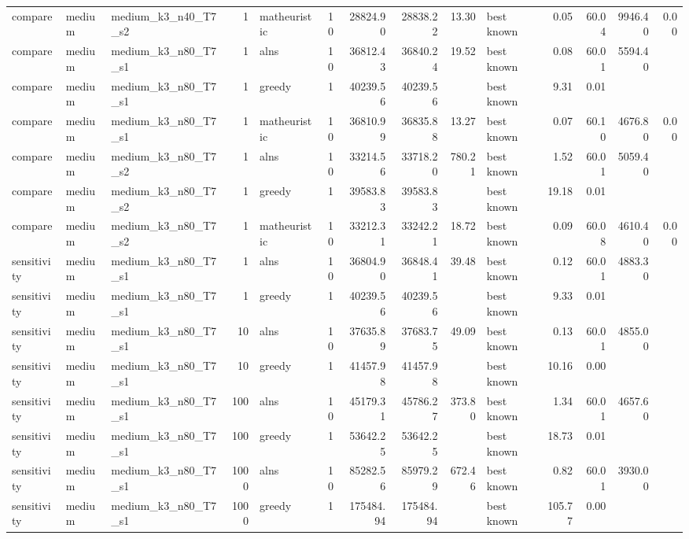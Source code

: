 \begin{tabular}{lllrlrrrrlrrrr}
compare & medium & medium\_k3\_n40\_T7\_s2 & 1 & matheuristic & 10 & 28824.90 & 28838.22 & 13.30 & best known & 0.05 & 60.04 & 9946.40 & 0.00 \\
compare & medium & medium\_k3\_n80\_T7\_s1 & 1 & alns & 10 & 36812.43 & 36840.24 & 19.52 & best known & 0.08 & 60.01 & 5594.40 &  \\
compare & medium & medium\_k3\_n80\_T7\_s1 & 1 & greedy & 1 & 40239.56 & 40239.56 &  & best known & 9.31 & 0.01 &  &  \\
compare & medium & medium\_k3\_n80\_T7\_s1 & 1 & matheuristic & 10 & 36810.99 & 36835.88 & 13.27 & best known & 0.07 & 60.10 & 4676.80 & 0.00 \\
compare & medium & medium\_k3\_n80\_T7\_s2 & 1 & alns & 10 & 33214.56 & 33718.20 & 780.21 & best known & 1.52 & 60.01 & 5059.40 &  \\
compare & medium & medium\_k3\_n80\_T7\_s2 & 1 & greedy & 1 & 39583.83 & 39583.83 &  & best known & 19.18 & 0.01 &  &  \\
compare & medium & medium\_k3\_n80\_T7\_s2 & 1 & matheuristic & 10 & 33212.31 & 33242.21 & 18.72 & best known & 0.09 & 60.08 & 4610.40 & 0.00 \\
sensitivity & medium & medium\_k3\_n80\_T7\_s1 & 1 & alns & 10 & 36804.90 & 36848.41 & 39.48 & best known & 0.12 & 60.01 & 4883.30 &  \\
sensitivity & medium & medium\_k3\_n80\_T7\_s1 & 1 & greedy & 1 & 40239.56 & 40239.56 &  & best known & 9.33 & 0.01 &  &  \\
sensitivity & medium & medium\_k3\_n80\_T7\_s1 & 10 & alns & 10 & 37635.89 & 37683.75 & 49.09 & best known & 0.13 & 60.01 & 4855.00 &  \\
sensitivity & medium & medium\_k3\_n80\_T7\_s1 & 10 & greedy & 1 & 41457.98 & 41457.98 &  & best known & 10.16 & 0.00 &  &  \\
sensitivity & medium & medium\_k3\_n80\_T7\_s1 & 100 & alns & 10 & 45179.31 & 45786.27 & 373.80 & best known & 1.34 & 60.01 & 4657.60 &  \\
sensitivity & medium & medium\_k3\_n80\_T7\_s1 & 100 & greedy & 1 & 53642.25 & 53642.25 &  & best known & 18.73 & 0.01 &  &  \\
sensitivity & medium & medium\_k3\_n80\_T7\_s1 & 1000 & alns & 10 & 85282.56 & 85979.29 & 672.46 & best known & 0.82 & 60.01 & 3930.00 &  \\
sensitivity & medium & medium\_k3\_n80\_T7\_s1 & 1000 & greedy & 1 & 175484.94 & 175484.94 &  & best known & 105.77 & 0.00 &  &  \\

\end{tabular}
